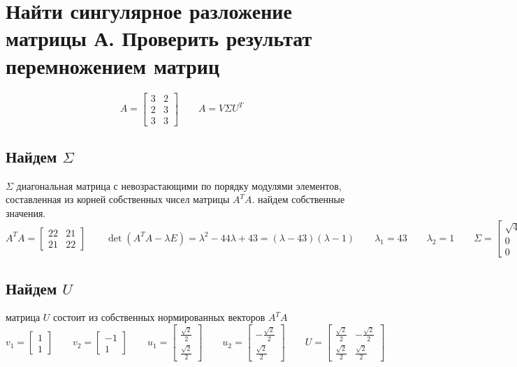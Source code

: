 \documentclass{article}
\begin{document}
  \section{Найти сингулярное разложение матрицы А. Проверить результат перемножением матриц}
  $$ A = \left[\begin{matrix}3 & 2\\2 & 3\\3 & 3\end{matrix}\right] \qquad A = V \Sigma U^T $$

  \subsection{Найдем $\Sigma$}
  $\Sigma$ диагональная матрица с невозрастающими по порядку модулями элементов, составленная из
  корней собственных чисел матрицы $A^TA$. найдем собственные значения.
  $$ A^TA = \left[\begin{matrix}22 & 21\\21 & 22\end{matrix}\right] \qquad
  \det(A^TA - \lambda E) = \lambda^{2} - 44 \lambda + 43 = \left(\lambda - 43\right) \left(\lambda - 1\right) \qquad
  \lambda_1 = 43 \qquad \lambda_2 = 1 \qquad
  \Sigma = \left[\begin{matrix}\sqrt{43} & 0\\0 & 1\\0 & 0\end{matrix}\right]
  $$

  \subsection{Найдем $U$}
  матрица $U$ состоит из собственных нормированных векторов $A^TA$
  $$v_1 = \left[\begin{matrix}1\\1\end{matrix}\right] \qquad
  v_2 = \left[\begin{matrix}-1\\1\end{matrix}\right] \qquad
  u_1 = \left[\begin{matrix}\frac{\sqrt{2}}{2}\\\frac{\sqrt{2}}{2}\end{matrix}\right] \qquad
  u_2 = \left[\begin{matrix}- \frac{\sqrt{2}}{2}\\\frac{\sqrt{2}}{2}\end{matrix}\right] \qquad
  U = \left[\begin{matrix}\frac{\sqrt{2}}{2} & - \frac{\sqrt{2}}{2}\\\frac{\sqrt{2}}{2} & \frac{\sqrt{2}}{2}\end{matrix}\right]
  $$
\end{document}
